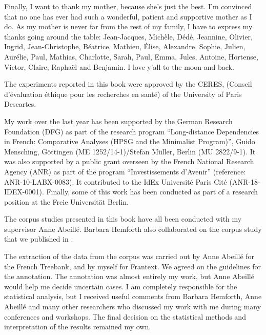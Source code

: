 Finally, I want to thank my mother, because she's just the best. I'm convinced that no one has ever had such a wonderful, patient and supportive mother as I do. As my mother is never far from the rest of my family, I have to express my thanks going around the table: Jean-Jacques, Michèle, Dédé, Jeannine, Olivier, Ingrid, Jean-Christophe, Béatrice, Mathieu, Élise, Alexandre, Sophie, Julien, Aurélie, Paul, Mathias, Charlotte, Sarah, Paul, Emma, Jules, Antoine, Hortense, Victor, Claire, Raphaël and Benjamin. I love y'all to the moon and back.


The experiments reported in this book were approved by the CERES, (Conseil d'évaluation éthique pour les recherches en santé) of the University of Paris Descartes. 

My work over the last year has been supported by the German Research Foundation (DFG) as part of the research program ``Long-distance Dependencies in French: Comparative Analyses (HPSG and the Minimalist Program)'', Guido Mensching, Göttingen (ME 1252/14-1)\slash Stefan Müller, Berlin (MU 2822/9-1). It was also supported by a public grant overseen by the French National Research Agency (ANR) as part of the program ``Investissements d'Avenir'' (reference: ANR-10-LABX-0083). It contributed to the IdEx Université Paris Cité (ANR-18-IDEX-0001). Finally, some of this work has been conducted as part of a research position at the Freie Universität Berlin.


The corpus studies presented in this book have all been conducted with my supervisor Anne Abeillé. Barbara Hemforth also collaborated on the corpus study that we published in \citet{Abeille.2016}.

The extraction of the data from the corpus was carried out by Anne Abeillé for the French Treebank, and by myself for Frantext. We agreed on the guidelines for the annotation. The annotation was almost entirely my work, but Anne Abeillé would help me decide uncertain cases. I am completely responsible for the statistical analysis, but I received useful comments from Barbara Hemforth, Anne Abeillé and many other researchers who discussed my work with me during many conferences and workshops. The final decision on the statistical methods and interpretation of the results remained my own.

